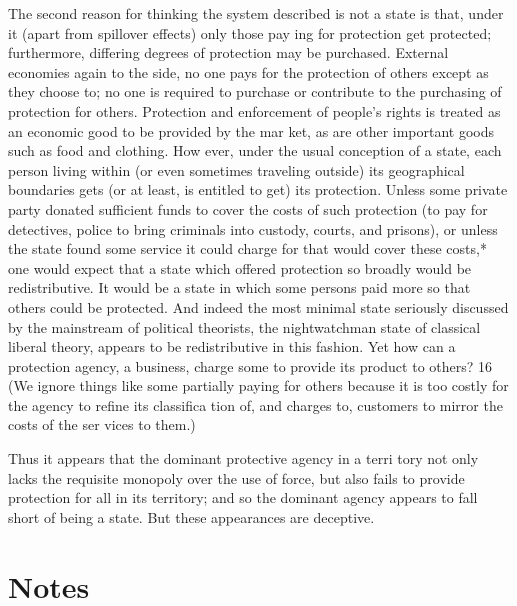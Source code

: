 \documentclass[11pt,openany]{book}
\newcommand{\booknoteshead}{%
  \phantomsection\section*{Notes}%
  \addcontentsline{toc}{section}{Notes}\markright{Notes}}
\begin{document}
The second reason for thinking the system described is not a state is that, under it (apart from spillover effects) only those pay ing for protection get protected; furthermore, differing degrees of protection may be purchased. External economies again to the side, no one pays for the protection of others except as they choose to; no one is required to purchase or contribute to the purchasing of protection for others. Protection and enforcement of people's rights is treated as an economic good to be provided by the mar ket, as are other important goods such as food and clothing. How ever, under the usual conception of a state, each person living within (or even sometimes traveling outside) its geographical boundaries gets (or at least, is entitled to get) its protection. Unless some private party donated sufficient funds to cover the costs of such protection (to pay for detectives, police to bring criminals into custody, courts, and prisons), or unless the state found some service it could charge for that would cover these costs,* one would expect that a state which offered protection so broadly would be redistributive. It would be a state in which some persons paid more so that others could be protected. And indeed the most minimal state seriously discussed by the mainstream of political theorists, the nightwatchman state of classical liberal theory, appears to be redistributive in this fashion. Yet how can a protection agency, a business, charge some to provide its product to others? 16 (We ignore things like some partially paying for others because it is too costly for the agency to refine its classifica tion of, and charges to, customers to mirror the costs of the ser vices to them.) 

Thus it appears that the dominant protective agency in a terri tory not only lacks the requisite monopoly over the use of force, but also fails to provide protection for all in its territory; and so the dominant agency appears to fall short of being a state. But these appearances are deceptive. 

\booknoteshead
\end{document}
